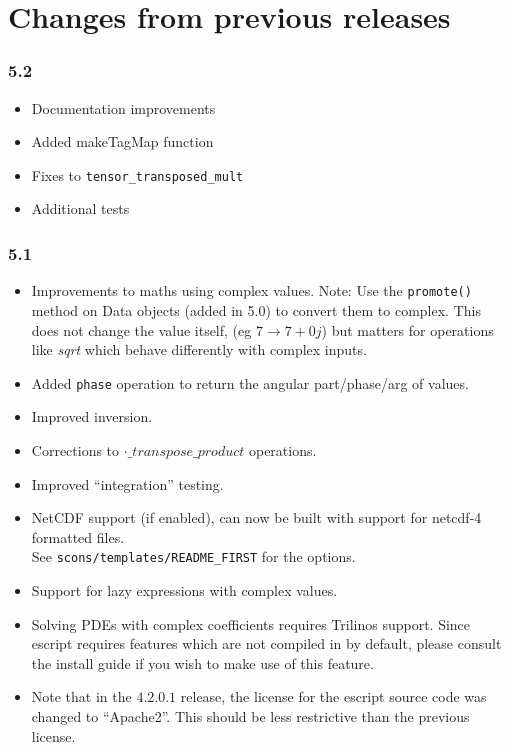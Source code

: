 
%
%
%

\chapter{Changes from previous releases}
\label{app:changes}

\subsection*{5.2}
\begin{itemize}
 \item Documentation improvements
 \item Added makeTagMap function
 \item Fixes to \texttt{tensor_transposed_mult}
 \item Additional tests
\end{itemize}

\subsection*{5.1}
\begin{itemize}
  \item Improvements to maths using complex values.
	  Note: Use the \texttt{promote()} method on Data objects (added in 5.0) to convert them to complex. 
This does not change the value itself, (eg $7 \rightarrow 7+0j$) but matters for operations like \emph{sqrt} which behave differently with complex inputs.
  \item Added \texttt{phase} operation to return the angular part/phase/arg of values.
  \item Improved inversion.
  \item Corrections to $\cdot\_transpose\_product$ operations.
  \item Improved ``integration'' testing.
  \item NetCDF support (if enabled), can now be built with support for netcdf-4 formatted files.\\
  See \texttt{scons/templates/README_FIRST} for the options.
  \item Support for lazy expressions with complex values.
  \item Solving PDEs with complex coefficients requires Trilinos support.
  Since escript requires features which are not 
  compiled in by default, please consult the install guide if you wish to make use of
  this feature.
  \item Note that in the $4.2.0.1$ release, the license for the escript source code was changed to ``Apache2''. 
  This should be less restrictive than the previous license.  
\end{itemize}

